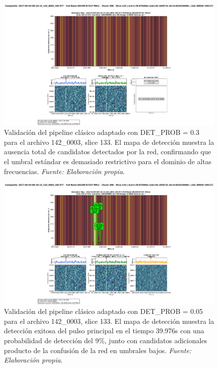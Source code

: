 \begin{figure}[H]
    \centering
    \includegraphics[width=\textwidth]{figures/2017-04-03-08-16-13_142_0003_t39.977_slice133.png}
    \caption[ALMA 142\_0003: DET\_PROB 0.3]{Validación del pipeline clásico adaptado con DET\_PROB = 0.3 para el archivo 142\_0003, slice 133. El mapa de detección muestra la ausencia total de candidatos detectados por la red, confirmando que el umbral estándar es demasiado restrictivo para el dominio de altas frecuencias. \textit{Fuente: Elaboración propia}.}
    \label{fig:142_0003_slice133_highProb}
\end{figure}

\begin{figure}[H]
    \centering
    \includegraphics[width=\textwidth]{figures/2017-04-03-08-16-13_142_0003_t39.977_slice133-lowProb.png}
    \caption[ALMA 142\_0003: DET\_PROB 0.05]{Validación del pipeline clásico adaptado con DET\_PROB = 0.05 para el archivo 142\_0003, slice 133. El mapa de detección muestra la detección exitosa del pulso principal en el tiempo 39.976s con una probabilidad de detección del 9\%, junto con candidatos adicionales producto de la confusión de la red en umbrales bajos. \textit{Fuente: Elaboración propia}.}
    \label{fig:142_0003_slice133_lowProb}
\end{figure}

